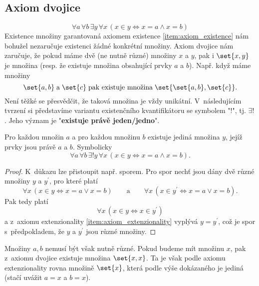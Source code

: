 \subsection{Axiom dvojice}
\begin{equation*}
    \forall a\,\forall b\,\exists y\,\forall x\,(x \in y \iff x=a \land x=b)
\end{equation*}
Existence množiny garantovaná axiomem existence \ref{item:axiom_existence} nám bohužel nezaručuje existenci žádné konkrétní množiny. Axiom dvojice nám zaručuje, že pokud máme dvě (ne nutně různé) množiny $x$ a $y$, pak i $\set{x,y}$ je množina (resp. že existuje množina obsahující prvky $a$ a $b$). Např. když máme množiny
\begin{equation*}
    \set{a,b}\;\text{a}\;\set{c}\;\text{pak existuje množina}\;\set{\set{a,b},\set{c}}.
\end{equation*}
Není těžké se přesvědčit, že taková množina je vždy unikátní. V~následujícím tvrzení si představíme variantu existenčního kvantifikátoru se symbolem "$!$", tj. $\exists!$. Jeho význam je "\textbf{existuje právě jeden/jedno}".
\begin{lemma}\label{lem:univerzalnost_neusp_dvojic}
    Pro každou množin $a$ a pro každou množinu $b$ existuje jediná množina $y$, jejíž prvky jsou právě $a$ a $b$. Symbolicky
    \begin{equation*}
        \forall a\,\forall b\,\exists!y\,\forall x\,(x \in y \iff x=a \land x=b).
    \end{equation*}
\end{lemma}
\begin{proof}
    K~důkazu lze přistoupit např. sporem. Pro spor nechť jsou dány dvě různé množiny $y$ a $y^\prime$, pro které platí
    \begin{equation*}
        \forall x\,(x\in y \iff x=a \lor x=b)\qquad \text{a}\qquad\forall x\, (x\in y^\prime \iff x=a \lor x=b).
    \end{equation*}
    Pak tedy platí
    \begin{equation*}
        \forall x\,(x\in y \iff x\in y^\prime)
    \end{equation*}
    a z~axiomu extenzionality \ref{item:axiom_extenzionality} vyplývá $y=y^\prime$, což je spor s~předpokladem, že $y$ a $y^\prime$ jsou různé množiny.
\end{proof}
Množiny $a,b$ nemusí být však nutně různé. Pokud budeme mít množinu $x$, pak z~axiomu dvojice existuje množina $\set{x,x}$. Ta je však podle axiomu extenzionality rovna množině $\set{x}$, která podle výše dokázaného je jediná (stačí uvážit $a=x$ a $b=x$).
